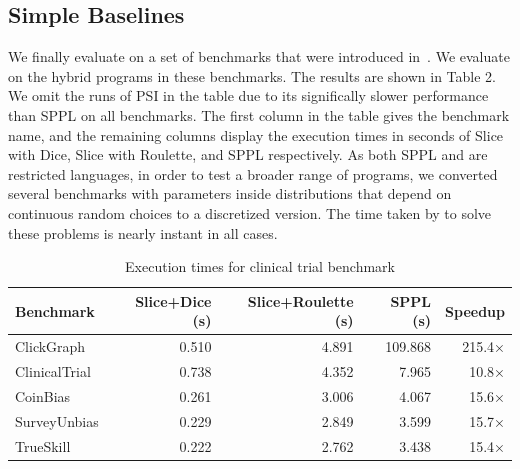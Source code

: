 \subsection{Simple Baselines}\label{sec:baseline-benchmarks}
We finally evaluate \Slice{} on a set of benchmarks that were introduced in~\cite{gehr2016psi}. We evaluate \Slice{} on the hybrid programs in these benchmarks. The results are shown in Table 2. We omit the runs of PSI in the table due to its significally slower performance than SPPL on all benchmarks. The first column in the table gives the benchmark name, and the remaining columns display the execution times in seconds of Slice with Dice, Slice with Roulette, and SPPL respectively. As both SPPL and \Slice{} are restricted languages, in order to test a broader range of programs, we converted several benchmarks with parameters inside distributions that depend on continuous random choices to a discretized version. The time taken by \Slice{} to solve these problems is nearly instant in all cases. 

\begin{table}[!t]
\centering
\begin{tabular}{lrrrr}
\toprule
Benchmark & Slice+Dice (s) & Slice+Roulette (s) & SPPL (s) & Speedup \\
\midrule
ClickGraph & 0.510 & 4.891 & 109.868 & 215.4× \\
ClinicalTrial & 0.738 & 4.352 & 7.965 & 10.8× \\
CoinBias & 0.261 & 3.006 & 4.067 & 15.6× \\
SurveyUnbias & 0.229 & 2.849 & 3.599 & 15.7× \\
TrueSkill & 0.222 & 2.762 & 3.438 & 15.4× \\
\bottomrule
\end{tabular}
\caption{Execution times for clinical trial benchmark}
\end{table}

